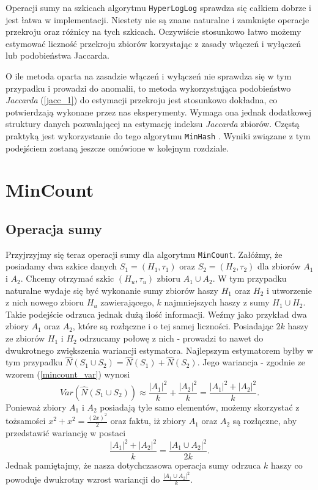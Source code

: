 Operacji sumy na szkicach algorytmu \texttt{HyperLogLog} sprawdza się całkiem dobrze i jest  łatwa w implementacji. Niestety nie są znane naturalne i zamknięte operacje przekroju oraz różnicy na tych szkicach. Oczywiście stosunkowo łatwo możemy estymować liczność przekroju zbiorów korzystając z zasady włączeń i wyłączeń lub podobieństwa Jaccarda.

O ile metoda oparta na zasadzie włączeń i wyłączeń nie sprawdza się w tym przypadku i prowadzi do anomalii, to metoda wykorzystująca podobieństwo \textit{Jaccarda} (\ref{jacc_1}) do estymacji przekroju jest stosunkowo dokładna, co potwierdzają wykonane przez nas eksperymenty. Wymaga ona jednak dodatkowej struktury danych pozwalającej na estymację indeksu \textit{Jaccarda} zbiorów. Częstą praktyką jest wykorzystanie do tego algorytmu \texttt{MinHash} \cite{adroll}. Wyniki związane z tym podejściem zostaną jeszcze omówione w kolejnym rozdziale.


\section{MinCount}
\label{impr_mincount}

\subsection{Operacja sumy}
\label{impr_sum}

Przyjrzyjmy się teraz operacji sumy dla algorytmu \texttt{MinCount}. Załóżmy, że posiadamy dwa szkice danych $S_1 = (H_1, {\tau}_1)$ oraz $S_2 = (H_2, {\tau}_2)$ dla zbiorów $A_1$ i $A_2$. Chcemy otrzymać szkic $(H_u, {\tau}_u)$ zbioru $A_1 \cup A_2$. W tym przypadku naturalne wydaje się być wykonanie sumy zbiorów haszy $H_1$ oraz $H_2$ i utworzenie z nich nowego zbioru $H_u$ zawierającego, $k$ najmniejszych haszy z sumy $H_1 \cup H_2$. Takie podejście  odrzuca jednak dużą ilość informacji. Weźmy jako przykład dwa zbiory $A_1$ oraz $A_2$, które są rozłączne i o tej samej liczności.
Posiadając $2k$ haszy ze zbiorów $H_1$ i $H_2$ odrzucamy połowę z nich - prowadzi to nawet do dwukrotnego zwiększenia wariancji estymatora. 
 Najlepszym estymatorem byłby w tym przypadku $\hat{N}(S_1 \cup S_2) = \hat{N}(S_1) + \hat{N}(S_2)$. Jego wariancja - zgodnie ze wzorem (\ref{mincount_var}) wynosi $$Var(\hat{N}(S_1 \cup S_2)) \approx \frac{|A_1|^2}{k} + \frac{|A_2|^2}{k} = \frac{|A_1|^2 + |A_2|^2}{k}.$$ Ponieważ zbiory $A_1$ i $A_2$ posiadają tyle samo elementów, możemy skorzystać z tożsamości $x^2 + x^2  = \frac{(2x)^2}{2}$ oraz faktu, iż zbiory $A_1$ oraz $A_2$ są rozłączne, aby przedstawić wariancję w postaci $$\frac{|A_1|^2 + |A_2|^2}{k} = \frac{|A_1 \cup A_2|^2}{2k}.$$ Jednak pamiętajmy, że nasza dotychczasowa operacja sumy odrzuca $k$ haszy co powoduje dwukrotny wzrost wariancji do $\frac{|A_1 \cup A_2|^2}{k}$.


